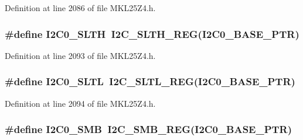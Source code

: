 Definition at line 2086 of file M\+K\+L25\+Z4.\+h.

\subsubsection[{\texorpdfstring{I2\+C0\+\_\+\+S\+L\+TH}{I2C0_SLTH}}]{\setlength{\rightskip}{0pt plus 5cm}\#define I2\+C0\+\_\+\+S\+L\+TH~{\bf I2\+C\+\_\+\+S\+L\+T\+H\+\_\+\+R\+EG}({\bf I2\+C0\+\_\+\+B\+A\+S\+E\+\_\+\+P\+TR})}\hypertarget{group___i2_c___register___accessor___macros_ga5872f84a45507eb59371a4fcc7c3e2c6}{}\label{group___i2_c___register___accessor___macros_ga5872f84a45507eb59371a4fcc7c3e2c6}


Definition at line 2093 of file M\+K\+L25\+Z4.\+h.

\subsubsection[{\texorpdfstring{I2\+C0\+\_\+\+S\+L\+TL}{I2C0_SLTL}}]{\setlength{\rightskip}{0pt plus 5cm}\#define I2\+C0\+\_\+\+S\+L\+TL~{\bf I2\+C\+\_\+\+S\+L\+T\+L\+\_\+\+R\+EG}({\bf I2\+C0\+\_\+\+B\+A\+S\+E\+\_\+\+P\+TR})}\hypertarget{group___i2_c___register___accessor___macros_gae914eeb0f84c8cf2420f6764ea979c6d}{}\label{group___i2_c___register___accessor___macros_gae914eeb0f84c8cf2420f6764ea979c6d}


Definition at line 2094 of file M\+K\+L25\+Z4.\+h.

\subsubsection[{\texorpdfstring{I2\+C0\+\_\+\+S\+MB}{I2C0_SMB}}]{\setlength{\rightskip}{0pt plus 5cm}\#define I2\+C0\+\_\+\+S\+MB~{\bf I2\+C\+\_\+\+S\+M\+B\+\_\+\+R\+EG}({\bf I2\+C0\+\_\+\+B\+A\+S\+E\+\_\+\+P\+TR})}\hypertarget{group___i2_c___register___accessor___macros_gaf27ba0a559fe4af8031d5de859d8ba47}{}\label{group___i2_c___register___accessor___macros_gaf27ba0a559fe4af8031d5de859d8ba47}


